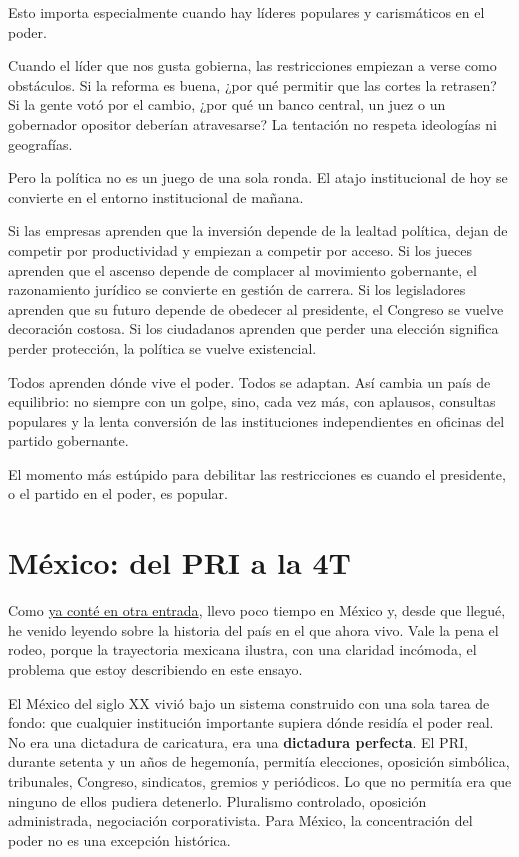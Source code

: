 \documentclass[11pt,letterpaper]{article}
\begin{document}
Esto importa especialmente cuando hay líderes populares y carismáticos en el poder.

Cuando el líder que nos gusta gobierna, las restricciones empiezan a verse como obstáculos. Si la reforma es buena, ¿por qué permitir que las cortes la retrasen? Si la gente votó por el cambio, ¿por qué un banco central, un juez o un gobernador opositor deberían atravesarse? La tentación no respeta ideologías ni geografías.

Pero la política no es un juego de una sola ronda. El atajo institucional de hoy se convierte en el entorno institucional de mañana.

Si las empresas aprenden que la inversión depende de la lealtad política, dejan de competir por productividad y empiezan a competir por acceso. Si los jueces aprenden que el ascenso depende de complacer al movimiento gobernante, el razonamiento jurídico se convierte en gestión de carrera. Si los legisladores aprenden que su futuro depende de obedecer al presidente, el Congreso se vuelve decoración costosa. Si los ciudadanos aprenden que perder una elección significa perder protección, la política se vuelve existencial.

Todos aprenden dónde vive el poder. Todos se adaptan. Así cambia un país de equilibrio: no siempre con un golpe, sino, cada vez más, con aplausos, consultas populares y la lenta conversión de las instituciones independientes en oficinas del partido gobernante.

El momento más estúpido para debilitar las restricciones es cuando el presidente, o el partido en el poder, es popular.

\section{México: del PRI a la 4T}

Como \href{URL_DE_ENTRADA_ANTERIOR}{ya conté en otra entrada}, llevo poco tiempo en México y, desde que llegué, he venido leyendo sobre la historia del país en el que ahora vivo. Vale la pena el rodeo, porque la trayectoria mexicana ilustra, con una claridad incómoda, el problema que estoy describiendo en este ensayo.

El México del siglo XX vivió bajo un sistema construido con una sola tarea de fondo: que cualquier institución importante supiera dónde residía el poder real. No era una dictadura de caricatura, era una \textbf{dictadura perfecta}. El PRI, durante setenta y un años de hegemonía, permitía elecciones, oposición simbólica, tribunales, Congreso, sindicatos, gremios y periódicos. Lo que no permitía era que ninguno de ellos pudiera detenerlo. Pluralismo controlado, oposición administrada, negociación corporativista. Para México, la concentración del poder no es una excepción histórica.
\end{document}
